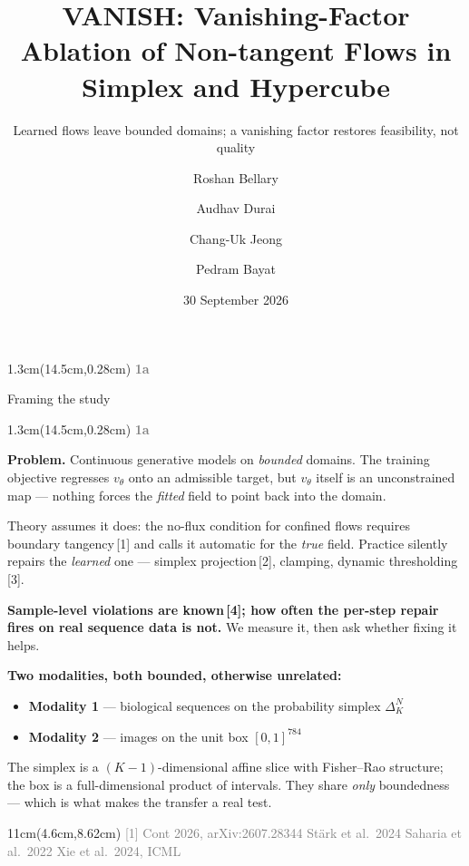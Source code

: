 \documentclass[aspectratio=169,10pt]{beamer}
\title{\textbf{VANISH: Vanishing-Factor Ablation of Non-tangent Flows in Simplex and Hypercube}}
\subtitle{\normalsize Learned flows leave bounded domains; a vanishing factor restores feasibility, not quality}
\author{Roshan Bellary \and Audhav Durai \and Chang-Uk Jeong \and Pedram Bayat}
\institute{\small CIS 6270, University of Pennsylvania}
\date{30 September 2026}
\newcommand{\lab}[1]{%
  \begin{textblock*}{1.3cm}(14.5cm,0.28cm)
    \raggedleft\bfseries\small\textcolor{gray}{#1}
  \end{textblock*}}
\newcommand{\srcs}[1]{%
  \begin{textblock*}{11cm}(4.6cm,8.62cm)
    \raggedleft\fontsize{4.8}{5.6}\selectfont\textcolor{gray}{#1}
  \end{textblock*}}
\begin{document}
{
\begin{frame}[plain]\lab{1a}\titlepage\end{frame}}


\begin{frame}{Framing the study}
\lab{1a}
\textbf{Problem.} Continuous generative models on \emph{bounded} domains. The training
objective regresses $v_\theta$ onto an admissible target, but $v_\theta$ itself is an
unconstrained map --- nothing forces the \emph{fitted} field to point back into the domain.

\medskip
Theory assumes it does: the no-flux condition for confined flows requires boundary
tangency\,[1] and calls it automatic for the \emph{true} field. Practice silently repairs the
\emph{learned} one --- simplex projection\,[2], clamping, dynamic thresholding\,[3].

\medskip
\textbf{Sample-level violations are known\,[4]; how often the per-step repair fires on real
sequence data is not.} We measure it, then ask whether fixing it helps.

\medskip
\textbf{Two modalities, both bounded, otherwise unrelated:}
\begin{itemize}
\item \textbf{Modality 1} --- biological sequences on the probability simplex $\Delta_K^N$
\item \textbf{Modality 2} --- images on the unit box $[0,1]^{784}$
\end{itemize}
The simplex is a $(K{-}1)$-dimensional affine slice with Fisher--Rao structure; the box is a
full-dimensional product of intervals. They share \emph{only} boundedness --- which is what
makes the transfer a real test.
\srcs{[1] Cont 2026, arXiv:2607.28344 \quad [2] St\"ark et al.\ 2024 \quad [3] Saharia et al.\ 2022 \quad [4] Xie et al.\ 2024, ICML}
\end{frame}
\end{document}
